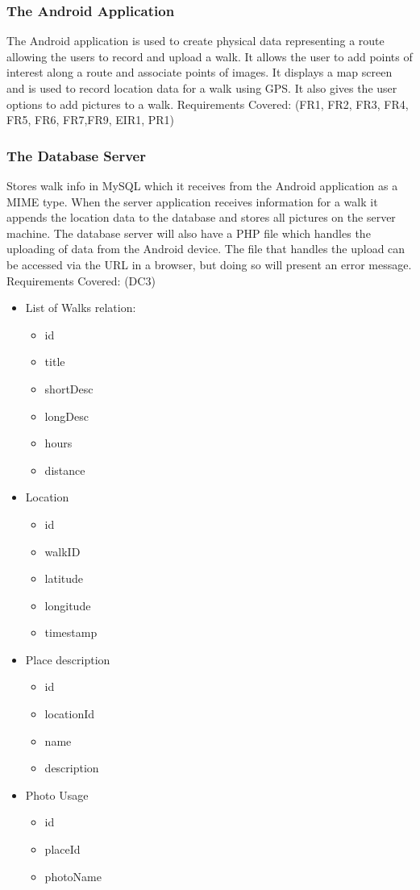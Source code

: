 \documentclass[12pt]{article}
\begin{document}
\subsubsection{The Android Application}
\par{The Android application is used to create physical data representing a route allowing the users to record and upload a walk. It allows the user to add points of interest along a route and associate points of images. It displays a map screen and is used to record location data for a walk using GPS. It also gives the user options to add pictures to a walk. \newline Requirements Covered: (FR1, FR2, FR3, FR4, FR5, FR6, FR7,FR9, EIR1, PR1)}
\subsubsection{The Database Server}
Stores walk info in MySQL which it receives from the Android application as a MIME type. When the server application receives information for a walk it appends the location data to the database and stores all pictures on the server machine. The database server will also have a PHP file which handles the uploading of data from the Android device. The file that handles the upload can be accessed via the URL in a browser, but doing so will present an error message.
Requirements Covered: (DC3)
\begin{itemize}
	\item List of Walks relation:
	\begin{itemize}
		\item id
		\item title
		\item shortDesc
		\item longDesc
		\item hours
		\item distance
	\end {itemize}
	\item Location
	\begin{itemize}
		\item id
		\item walkID
		\item latitude
		\item longitude
		\item timestamp
	\end{itemize}
	\item Place description
	\begin{itemize}
		\item id
		\item locationId
		\item name
		\item description
	\end{itemize}
	\item Photo Usage
	\begin{itemize}
		\item id
		\item placeId
		\item photoName
	\end{itemize}
\end{itemize}
\end{document}
